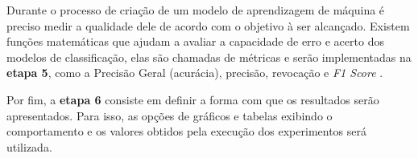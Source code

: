 Durante o processo de criação de um modelo de aprendizagem de máquina é preciso medir a qualidade dele de acordo com o objetivo à ser alcançado. Existem funções matemáticas que ajudam a avaliar a capacidade de erro e acerto dos modelos de classificação, elas são chamadas de métricas e serão implementadas na \textbf{etapa 5}, como a Precisão Geral (acurácia), precisão, revocação e \textit{F1 Score} \cite{tfidf-martins2003metodologia}.

Por fim, a \textbf{etapa 6} consiste em definir a forma com que os resultados serão apresentados. Para isso, as opções de gráficos e tabelas exibindo o comportamento e os valores obtidos pela execução dos experimentos será utilizada.